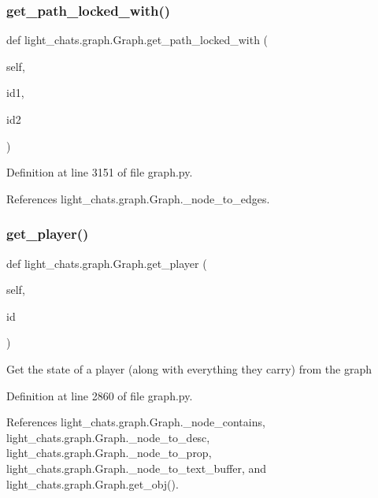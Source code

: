 \subsubsection{\texorpdfstring{get\+\_\+path\+\_\+locked\+\_\+with()}{get\_path\_locked\_with()}}
{\footnotesize\ttfamily def light\+\_\+chats.\+graph.\+Graph.\+get\+\_\+path\+\_\+locked\+\_\+with (\begin{DoxyParamCaption}\item[{}]{self,  }\item[{}]{id1,  }\item[{}]{id2 }\end{DoxyParamCaption})}



Definition at line 3151 of file graph.\+py.



References light\+\_\+chats.\+graph.\+Graph.\+\_\+node\+\_\+to\+\_\+edges.

\mbox{\label{classlight__chats_1_1graph_1_1Graph_a7f86299224bed2c821ed4ffa853cd669}} 
\subsubsection{\texorpdfstring{get\+\_\+player()}{get\_player()}}
{\footnotesize\ttfamily def light\+\_\+chats.\+graph.\+Graph.\+get\+\_\+player (\begin{DoxyParamCaption}\item[{}]{self,  }\item[{}]{id }\end{DoxyParamCaption})}

\begin{DoxyVerb}Get the state of a player (along with everything they carry) from
the graph
\end{DoxyVerb}
 

Definition at line 2860 of file graph.\+py.



References light\+\_\+chats.\+graph.\+Graph.\+\_\+node\+\_\+contains, light\+\_\+chats.\+graph.\+Graph.\+\_\+node\+\_\+to\+\_\+desc, light\+\_\+chats.\+graph.\+Graph.\+\_\+node\+\_\+to\+\_\+prop, light\+\_\+chats.\+graph.\+Graph.\+\_\+node\+\_\+to\+\_\+text\+\_\+buffer, and light\+\_\+chats.\+graph.\+Graph.\+get\+\_\+obj().

